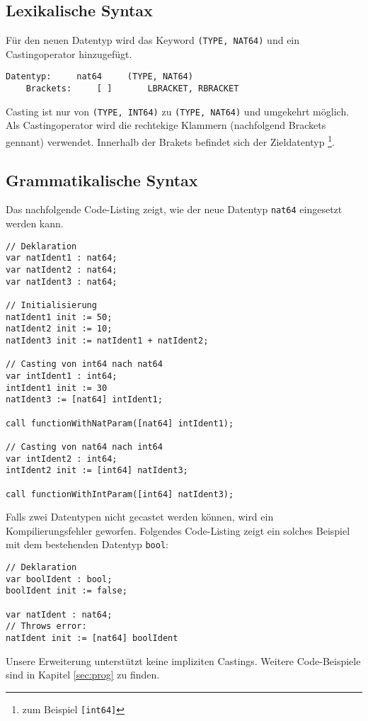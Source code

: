\documentclass[10pt, a4paper, twocolumn]{article} %
\begin{document}
\subsection{Lexikalische Syntax}
Für den neuen Datentyp wird das Keyword \texttt{(TYPE, NAT64)} und ein Castingoperator hinzugefügt.

\begin{lstlisting}[backgroundcolor = \color{lightgray},
xleftmargin = 0.05cm,
framexleftmargin = 0.05em]
    Datentyp:     nat64     (TYPE, NAT64)
    Brackets:     [ ]       LBRACKET, RBRACKET
\end{lstlisting}

Casting ist nur von \texttt{(TYPE, INT64)} zu \texttt{(TYPE, NAT64)} und umgekehrt möglich.
Als Castingoperator wird die rechtekige Klammern (nachfolgend Brackets gennant) verwendet.
Innerhalb der Brakets befindet sich der Zieldatentyp \footnote{zum Beispiel \texttt{[int64]}}.

\subsection{Grammatikalische Syntax}
Das nachfolgende Code-Listing zeigt, wie der neue Datentyp \texttt{nat64} eingesetzt werden kann.
\begin{lstlisting}
// Deklaration
var natIdent1 : nat64;
var natIdent2 : nat64;
var natIdent3 : nat64;

// Initialisierung
natIdent1 init := 50;
natIdent2 init := 10;
natIdent3 init := natIdent1 + natIdent2;

// Casting von int64 nach nat64
var intIdent1 : int64;
intIdent1 init := 30
natIdent3 := [nat64] intIdent1;

call functionWithNatParam([nat64] intIdent1);

// Casting von nat64 nach int64
var intIdent2 : int64;
intIdent2 init := [int64] natIdent3;

call functionWithIntParam([int64] natIdent3);
\end{lstlisting}
Falls zwei Datentypen nicht gecastet werden können, wird ein Kompilierungsfehler geworfen.
Folgendes Code-Listing zeigt ein solches Beispiel mit dem bestehenden Datentyp \texttt{bool}:
\begin{lstlisting}
// Deklaration
var boolIdent : bool;
boolIdent init := false;

var natIdent : nat64;
// Throws error:
natIdent init := [nat64] boolIdent
\end{lstlisting}
Unsere Erweiterung unterstützt keine impliziten Castings.
Weitere Code-Beispiele sind in Kapitel \ref{sec:prog} zu finden.
\end{document}
